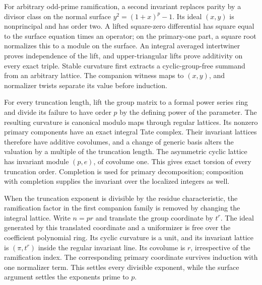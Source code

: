 \documentclass[11pt,a4paper]{article}
\theoremstyle{definition}\newtheorem{definition}[theorem]{Definition}
\theoremstyle{remark}\newtheorem{remark}[theorem]{Remark}
\begin{document}
For arbitrary odd-prime ramification, a second invariant replaces
parity by a divisor class on the normal surface
$y^2=(1+x)^p-1$.  Its ideal $(x,y)$ is nonprincipal and has
order two.  A lifted square-zero differential has square equal to
the surface equation times an operator; on the primary-one part,
a square root normalizes this to a module on the surface.  An
integral averaged intertwiner proves independence of the lift,
and upper-triangular lifts prove additivity on every exact triple.
Stable curvature first extracts a cyclic-group-free summand from
an arbitrary lattice.  The companion witness maps to $(x,y)$,
and normalizer twists separate its value before induction.

For every truncation length, lift the group matrix to a formal power
series ring and divide its failure to have order $p$ by the defining
power of the parameter.  The resulting curvature is canonical modulo
maps through regular lattices.  Its nonzero primary components have
an exact integral Tate complex.  Their invariant lattices therefore
have additive covolumes, and a change of generic basis alters the
valuation by a multiple of the truncation length.  The asymmetric
cyclic lattice has invariant module $(p,e)$, of covolume one.
This gives exact torsion of every truncation order.  Completion is
used for primary decomposition; composition with completion supplies
the invariant over the localized integers as well.

When the truncation exponent is divisible by the residue
characteristic, the ramification factor in the first companion
family is removed by changing the integral lattice.  Write $n=pr$
and translate the group coordinate by $t^r$.  The ideal generated
by this translated coordinate and a uniformizer is free over the
coefficient polynomial ring.  Its cyclic curvature is a unit, and
its invariant lattice is $(\pi,t^r)$ inside the regular invariant
line.  Its covolume is $r$, irrespective of the ramification index.
The corresponding primary coordinate survives induction with one
normalizer term.  This settles every divisible exponent, while the
surface argument settles the exponents prime to $p$.
\end{document}
